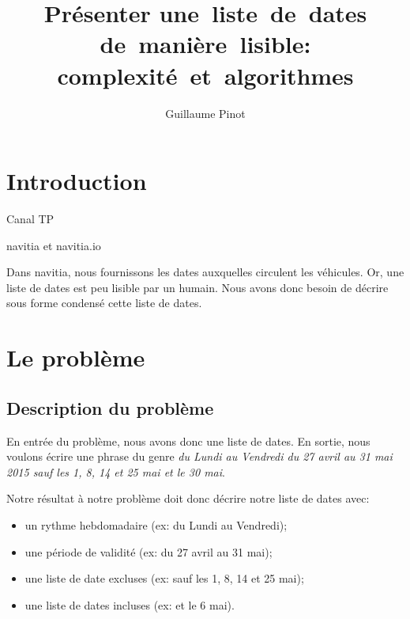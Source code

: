\documentclass{roadef}
\begin{document}
\title{Présenter une~liste~de~dates de~manière~lisible: complexité~et~algorithmes}

\def\shorttitle{Présenter une~liste~de~dates de~manière~lisible}

\author{Guillaume Pinot}

{}

\maketitle
\thispagestyle{empty}



\section{Introduction}

Canal TP

navitia et navitia.io

Dans navitia, nous fournissons les dates auxquelles circulent les
véhicules.  Or, une liste de dates est peu lisible par un humain. Nous
avons donc besoin de décrire sous forme condensé cette liste de dates.

\section{Le problème}

\subsection{Description du problème}

En entrée du problème, nous avons donc une liste de dates.  En sortie,
nous voulons écrire une phrase du genre \emph{du Lundi au Vendredi du
  27 avril au 31 mai 2015 sauf les 1, 8, 14 et 25 mai et le 30 mai}.

Notre résultat à notre problème doit donc décrire notre liste de dates
avec:
\begin{itemize}
\item un rythme hebdomadaire (ex: du Lundi au Vendredi);
\item une période de validité (ex: du 27 avril au 31 mai);
\item une liste de date excluses (ex: sauf les 1, 8, 14 et 25 mai);
\item une liste de dates incluses (ex: et le 6 mai).
\end{itemize}
\end{document}
